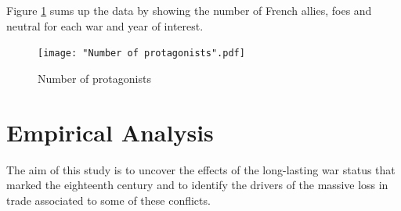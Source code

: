 \documentclass[12pt,a4paper,notitlepage,english]{article}
\begin{document}
Figure \ref{Number_of_protagonists} sums up the data by showing the number of French allies, foes and neutral for each war and year of interest. \\
\begin{center}
\begin{figure}[H]
\caption{Number of protagonists}
\label{Number_of_protagonists}
\centering
\texttt{[image: "Number of protagonists".pdf]}
\end{figure}
\end{center}


\section{Empirical Analysis} \label{analysis}
The aim of this study is to uncover the effects of the long-lasting war status that marked the eighteenth century and to identify the drivers of the massive loss in trade associated to some of these conflicts. \\ 


\end{document}
